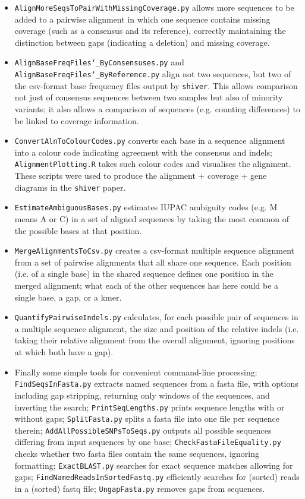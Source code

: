 \documentclass{article}
\newcommand{\shiv}{\c{shiver}\xspace}
\let\c\texttt
\begin{document}
\begin{itemize}
\item \c{AlignMoreSeqsToPairWithMissingCoverage.py} allows more sequences to be added to a pairwise alignment in which one sequence contains missing coverage (such as a consensus and its reference), correctly maintaining the distinction between gaps (indicating a deletion) and missing coverage.

\item \c{AlignBaseFreqFiles\char`_ByConsensuses.py} and \c{AlignBaseFreqFiles\char`_ByReference.py} align not two sequences, but two of the csv-format base frequency files output by \shiv.
This allows comparison not just of consensus sequences between two samples but also of minority variants; it also allows a comparison of sequences (e.g. counting differences) to be linked to coverage information.

\item \c{ConvertAlnToColourCodes.py} converts each base in a sequence alignment into a colour code indicating agreement with the consensus and indels; \c{AlignmentPlotting.R} takes such colour codes and visualises the alignment.
These scripts were used to produce the alignment + coverage + gene diagrams in the \shiv paper.

\item \c{EstimateAmbiguousBases.py} estimates IUPAC ambiguity codes (e.g. M means A or C) in a set of aligned sequences by taking the most common of the possible bases at that position.

\item \c{MergeAlignmentsToCsv.py} creates a csv-format multiple sequence alignment from a set of pairwise alignments that all share one sequence.
Each position (i.e. of a single base) in the shared sequence defines one position in the merged alignment; what each of the other sequences has here could be a single base, a gap, or a kmer.

\item \c{QuantifyPairwiseIndels.py} calculates, for each possible pair of sequences in a multiple sequence alignment, the size and position of the relative indels (i.e. taking their relative alignment from the overall alignment, ignoring positions at which both have a gap).

\item Finally some simple tools for convenient command-line processing: \c{FindSeqsInFasta.py} extracts named sequences from a fasta file, with options including gap stripping, returning only windows of the sequences, and inverting the search; \c{PrintSeqLengths.py} prints sequence lengths with or without gaps; \c{SplitFasta.py} splits a fasta file into one file per sequence therein; \c{AddAllPossibleSNPsToSeqs.py} outputs all possible sequences differing from input sequences by one base; \c{CheckFastaFileEquality.py} checks whether two fasta files contain the same sequences, ignoring formatting; \c{ExactBLAST.py} searches for exact sequence matches allowing for gaps; \c{FindNamedReadsInSortedFastq.py} efficiently searches for (sorted) reads in a (sorted) fastq file; \c{UngapFasta.py} removes gaps from sequences.
\end{itemize}
\end{document}
